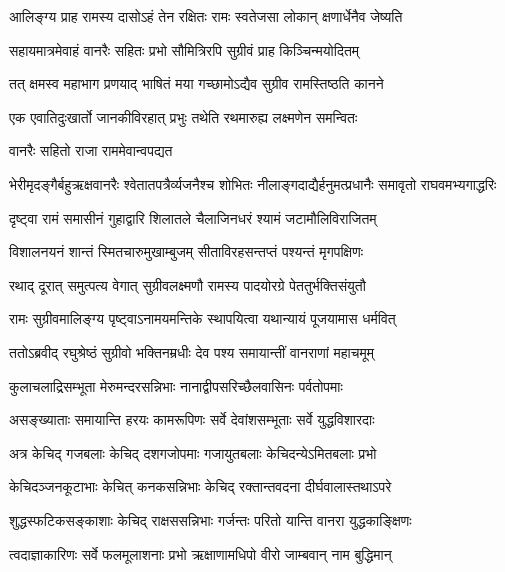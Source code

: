 \twolineshloka
{आलिङ्ग्य प्राह रामस्य दासोऽहं तेन रक्षितः}
{रामः स्वतेजसा लोकान् क्षणार्धेनैव जेष्यति} %

\twolineshloka
{सहायमात्रमेवाहं वानरैः सहितः प्रभो}
{सौमित्रिरपि सुग्रीवं प्राह किञ्चिन्मयोदितम्} %

\twolineshloka
{तत् क्षमस्व महाभाग प्रणयाद् भाषितं मया}
{गच्छामोऽद्यैव सुग्रीव रामस्तिष्ठति कानने} %

\twolineshloka
{एक एवातिदुःखार्तो जानकीविरहात् प्रभुः}
{तथेति रथमारुह्य लक्ष्मणेन समन्वितः} %

\onelineshloka
{वानरैः सहितो राजा राममेवान्वपद्यत} %

\fourlineindentedshloka
{भेरीमृदङ्गैर्बहुऋक्षवानरैः}
{श्वेतातपत्रैर्व्यजनैश्च शोभितः}
{नीलाङ्गदाद्यैर्हनुमत्प्रधानैः}
{समावृतो राघवमभ्यगाद्धरिः} %





\twolineshloka
{दृष्ट्वा रामं समासीनं गुहाद्वारि शिलातले}
{चैलाजिनधरं श्यामं जटामौलिविराजितम्} %

\twolineshloka
{विशालनयनं शान्तं स्मितचारुमुखाम्बुजम्}
{सीताविरहसन्तप्तं पश्यन्तं मृगपक्षिणः} %

\twolineshloka
{रथाद् दूरात् समुत्पत्य वेगात् सुग्रीवलक्ष्मणौ}
{रामस्य पादयोरग्रे पेततुर्भक्तिसंयुतौ} %

\twolineshloka
{रामः सुग्रीवमालिङ्ग्य पृष्ट्वाऽनामयमन्तिके}
{स्थापयित्वा यथान्यायं पूजयामास धर्मवित्} %

\twolineshloka
{ततोऽब्रवीद् रघुश्रेष्ठं सुग्रीवो भक्तिनम्रधीः}
{देव पश्य समायान्तीं वानराणां महाचमूम्} %

\twolineshloka
{कुलाचलाद्रिसम्भूता मेरुमन्दरसन्निभाः}
{नानाद्वीपसरिच्छैलवासिनः पर्वतोपमाः} %

\twolineshloka
{असङ्ख्याताः समायान्ति हरयः कामरूपिणः}
{सर्वे देवांशसम्भूताः सर्वे युद्धविशारदाः} %

\twolineshloka
{अत्र केचिद् गजबलाः केचिद् दशगजोपमाः}
{गजायुतबलाः केचिदन्येऽमितबलाः प्रभो} %

\twolineshloka
{केचिदञ्जनकूटाभाः केचित् कनकसन्निभाः}
{केचिद् रक्तान्तवदना दीर्घवालास्तथाऽपरे} %

\twolineshloka
{शुद्धस्फटिकसङ्काशाः केचिद् राक्षससन्निभाः}
{गर्जन्तः परितो यान्ति वानरा युद्धकाङ्क्षिणः} %

\twolineshloka
{त्वदाज्ञाकारिणः सर्वे फलमूलाशनाः प्रभो}
{ऋक्षाणामधिपो वीरो जाम्बवान् नाम बुद्धिमान्} %

